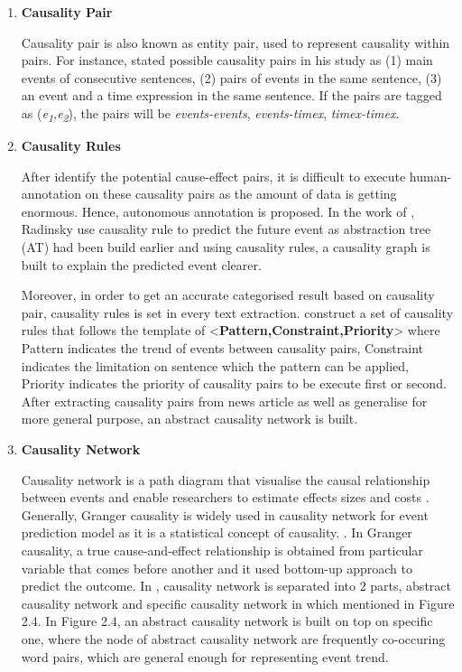 \documentclass[twoside]{utmthesis}
\begin{document}
\begin{enumerate}
	\item \textbf{Causality Pair}
	
	Causality pair is also known as entity pair, used to represent causality within pairs. For instance, \cite{mirza2014extracting} stated possible causality pairs in his study as (1) main events of consecutive sentences, (2) pairs of events in the same sentence, (3) an event and a time expression in the same sentence. If the pairs are tagged as (\textit{e\textsubscript{1},e\textsubscript{2}}), the pairs will be \textit{events-events}, \textit{events-timex}, \textit{timex-timex}. 
	
	\item \textbf{Causality Rules}
	
	After identify the potential cause-effect pairs, it is difficult to execute human-annotation on these causality pairs as the amount of data is getting enormous. Hence, autonomous annotation is proposed. 	In the work of \cite{radinsky2012learning}, Radinsky use causality rule to predict the future event as abstraction tree (AT) had been build earlier and using causality rules, a causality graph is built to explain the predicted event clearer.
	
	Moreover, in order to get an accurate categorised result based on causality pair, causality rules is set in every text extraction. \cite{zhao2017constructing} construct a set of causality rules that follows the template of <\textbf{Pattern,Constraint,Priority}> where Pattern indicates the trend of events between causality pairs, Constraint indicates the limitation on sentence which the pattern can be applied, Priority indicates the priority of causality pairs to be execute first or second. After extracting causality pairs from news article as well as generalise for more general purpose, an abstract causality network is built. 
	

	
	\item \textbf{Causality Network}
	
	Causality network is a path diagram that visualise the causal relationship between events and enable researchers to estimate effects sizes and costs \citep{dahlhaus2003causality}. Generally, Granger causality is widely used in causality network for event prediction model as it is a statistical concept of causality. \citep{Seth2007}. In Granger causality, a true cause-and-effect relationship is obtained from particular variable that comes before another and it used bottom-up approach to predict the outcome. 
	In \cite{zhao2017constructing}, causality network is separated into 2 parts, abstract causality network and specific causality network in which mentioned in Figure 2.4. In Figure 2.4, an abstract causality network is built on top on specific one, where the node of abstract causality network are frequently co-occuring word pairs, which are general enough for representing event trend. 
	 

\end{enumerate}
\end{document}
